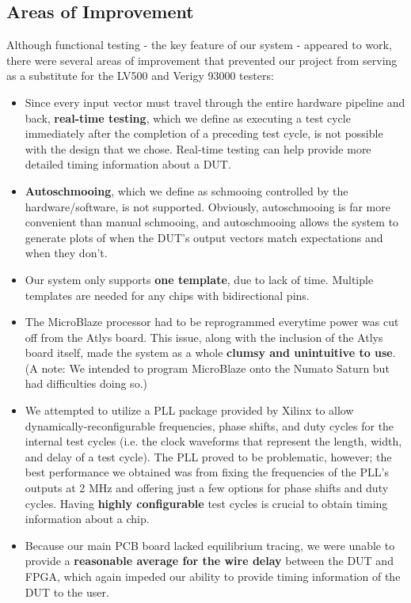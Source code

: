 \subsection{Areas of Improvement}
Although functional testing - the key feature of our system - appeared to work, there were several areas of improvement that prevented our project from serving as a substitute for the LV500 and Verigy 93000 testers: 
\begin{itemize}
\item Since every input vector must travel through the entire hardware pipeline and back, \textbf{real-time testing}, which we define as executing a test cycle immediately after the completion of a preceding test cycle, is not possible with the design that we chose. Real-time testing can help provide more detailed timing information about a DUT.
\item \textbf{Autoschmooing}, which we define as schmooing controlled by the hardware/software, is not supported. Obviously, autoschmooing is far more convenient than manual schmooing, and autoschmooing allows the system to generate plots of when the DUT's output vectors match expectations and when they don't.
\item Our system only supports \textbf{one template}, due to lack of time. Multiple templates are needed for any chips with bidirectional pins.
\item The MicroBlaze processor had to be reprogrammed everytime power was cut off from the Atlys board. This issue, along with the inclusion of the Atlys board itself, made the system as a whole \textbf{clumsy and unintuitive to use}. (A note: We intended to program MicroBlaze onto the Numato Saturn but had difficulties doing so.)
\item We attempted to utilize a PLL package provided by Xilinx to allow dynamically-reconfigurable frequencies, phase shifts, and duty cycles for the internal test cycles (i.e. the clock waveforms that represent the length, width, and delay of a test cycle). The PLL proved to be problematic, however; the best performance we obtained was from fixing the frequencies of the PLL's outputs at 2 MHz and offering just a few options for phase shifts and duty cycles. Having \textbf{highly configurable} test cycles is crucial to obtain timing information about a chip.
\item  Because our main PCB board lacked equilibrium tracing, we were unable to provide a \textbf{reasonable average for the wire delay} between the DUT and FPGA, which again impeded our ability to provide timing information of the DUT to the user.
\end{itemize}

\newpage